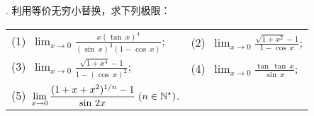 . 利用等价无穷小替换，求下列极限：
\begin{table}[H]
    \centering
    \begin{tabularx}{\textwidth} {  >{\raggedright\arraybackslash}X >{\raggedright\arraybackslash}X  }
        (1)~$\displaystyle\lim_{x \to 0} \displaystyle\frac{x (\tan \, x)^4}{(\sin \, x)^3 \left(1-\cos \, x\right)}$; & (2)~$\displaystyle\lim_{x \to 0} \displaystyle\frac{\sqrt{1+x^2}-1}{1-\cos \, x}$; \\[1em]
        (3)~$\displaystyle\lim_{x \to 0} \displaystyle\frac{\sqrt{1+x^4}-1}{1-(\cos \, x)^2}$; & (4)~$\displaystyle\lim_{x \to 0}\displaystyle\frac{\tan \, \tan \, x}{\sin \, x}$; \\[1em]
        (5)~$\displaystyle\lim_{x \to 0} \displaystyle\frac{(1+x+x^2)^{1/n}-1}{\sin \, 2x} \; (n \in \mathbb{N}^\star)$.
    \end{tabularx}
\end{table}
